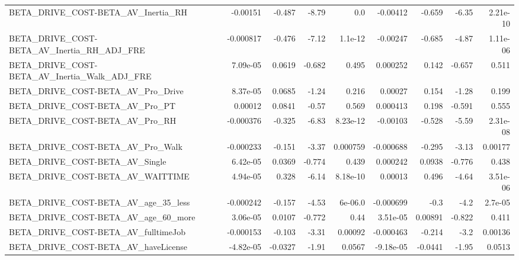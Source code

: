 \begin{tabular}{lrrrrrrrr}
BETA\_DRIVE\_COST-BETA\_AV\_Inertia\_RH                 &    -0.00151 &       -0.487 &    -8.79 &      0.0 &   -0.00412 &      -0.659 &        -6.35 &      2.21e-10 \\
BETA\_DRIVE\_COST-BETA\_AV\_Inertia\_RH\_ADJ\_FRE         &   -0.000817 &       -0.476 &    -7.12 &  1.1e-12 &   -0.00247 &      -0.685 &        -4.87 &      1.11e-06 \\
BETA\_DRIVE\_COST-BETA\_AV\_Inertia\_Walk\_ADJ\_FRE       &    7.09e-05 &       0.0619 &   -0.682 &    0.495 &   0.000252 &       0.142 &       -0.657 &         0.511 \\
BETA\_DRIVE\_COST-BETA\_AV\_Pro\_Drive                  &    8.37e-05 &       0.0685 &    -1.24 &    0.216 &    0.00027 &       0.154 &        -1.28 &         0.199 \\
BETA\_DRIVE\_COST-BETA\_AV\_Pro\_PT                     &     0.00012 &       0.0841 &    -0.57 &    0.569 &   0.000413 &       0.198 &       -0.591 &         0.555 \\
BETA\_DRIVE\_COST-BETA\_AV\_Pro\_RH                     &   -0.000376 &       -0.325 &    -6.83 & 8.23e-12 &   -0.00103 &      -0.528 &        -5.59 &      2.31e-08 \\
BETA\_DRIVE\_COST-BETA\_AV\_Pro\_Walk                   &   -0.000233 &       -0.151 &    -3.37 & 0.000759 &  -0.000688 &      -0.295 &        -3.13 &       0.00177 \\
BETA\_DRIVE\_COST-BETA\_AV\_Single                     &    6.42e-05 &       0.0369 &   -0.774 &    0.439 &   0.000242 &      0.0938 &       -0.776 &         0.438 \\
BETA\_DRIVE\_COST-BETA\_AV\_WAITTIME                   &    4.94e-05 &        0.328 &    -6.14 & 8.18e-10 &    0.00013 &       0.496 &        -4.64 &      3.51e-06 \\
BETA\_DRIVE\_COST-BETA\_AV\_age\_35\_less                &   -0.000242 &       -0.157 &    -4.53 &  6e-06.0 &  -0.000699 &        -0.3 &         -4.2 &       2.7e-05 \\
BETA\_DRIVE\_COST-BETA\_AV\_age\_60\_more                &    3.06e-05 &       0.0107 &   -0.772 &     0.44 &   3.51e-05 &     0.00891 &       -0.822 &         0.411 \\
BETA\_DRIVE\_COST-BETA\_AV\_fulltimeJob                &   -0.000153 &       -0.103 &    -3.31 &  0.00092 &  -0.000463 &      -0.214 &         -3.2 &       0.00136 \\
BETA\_DRIVE\_COST-BETA\_AV\_haveLicense                &   -4.82e-05 &      -0.0327 &    -1.91 &   0.0567 &  -9.18e-05 &     -0.0441 &        -1.95 &        0.0513 \\

\end{tabular}
